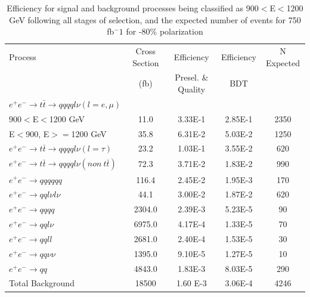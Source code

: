 \begin{table}
  \centering
  \begin{tabular}{l | c | c | c | c}
    \toprule
     Process     & Cross Section & Efficiency & Efficiency & N Expected\\
     & (fb) & Presel. \& Quality & BDT & \\
     \midrule
    $e^+e^-\rightarrow t\bar{t} \rightarrow qqqql\nu (l=e,\mu)$&  &  & &\\
    900$<$E$<$1200 GeV & 11.0 & 3.33E-1 & 2.85E-1 & 2350\\
    E$<$900, E$>=$1200 GeV & 35.8 & 6.31E-2 & 5.03E-2 & 1250 \\
    \midrule
    $e^+e^-\rightarrow t\bar{t} \rightarrow qqqql\nu (l=\tau)$& 23.2 & 1.03E-1  & 3.55E-2 & 620 \\
    \midrule
    $e^+e^-\rightarrow t\bar{t} \rightarrow qqqql\nu (non ~ t\bar{t})$& 72.3 & 3.71E-2 & 1.83E-2 & 990\\
    \midrule
    $e^+e^-\rightarrow qqqqqq$ & 116.4 & 2.45E-2 & 1.95E-3& 170 \\
    \midrule
    $e^+e^-\rightarrow qql\nu l\nu$ & 44.1 & 3.00E-2 & 1.87E-2 & 620\\
    \midrule
    $e^+e^-\rightarrow qqqq$ & 2304.0 & 2.39E-3 & 5.23E-5 & 90 \\
    \midrule
    $e^+e^-\rightarrow qql\nu$ & 6975.0 & 4.17E-4& 1.33E-5& 70 \\
    \midrule
    $e^+e^-\rightarrow qqll$ & 2681.0 & 2.40E-4& 1.53E-5 & 30 \\
    \midrule
    $e^+e^-\rightarrow qq\nu\nu$ & 1395.0 & 9.10E-5 & 1.27E-5 & 10 \\
    \midrule
    $e^+e^-\rightarrow qq$ & 4843.0 & 1.83E-3 & 8.03E-5 & 290\\
    \midrule
    \midrule
    Total Background & 18500 & 1.60 E-3 & 3.06E-4&  4246 \\
    \bottomrule
  \end{tabular}
  \caption{Efficiency for signal and background processes being classified as 900$<$E$<$1200 GeV following all stages of selection, and the expected number of events for 750 fb$^-1$ for -80\% polarization}
  \label{table:topfinalefficienciesnegMidE}
\end{table}

